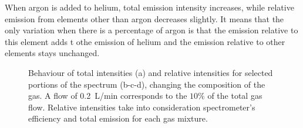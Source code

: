 When argon is added to helium, total emission intensity increases, while relative emission from elements other than argon decreases slightly. It means that the only variation when there is a percentage of argon is that the emission relative to this element adds t othe emission of helium and the emission relative to other elements stays unchanged.
\begin{figure}
\centering
  
  
  \hfill
  
\caption{Behaviour of total intensities (a) and relative intensities for selected portions of the spectrum (b-c-d), changing the composition of the gas. A flow of \SI{0.2}{\liter/\minute} corresponds to the $\num{10}\%$ of the total gas flow. Relative intensities take into consideration spectrometer's efficiency and total emission for each gas mixture.}
 \label{fig:Irel_flow}
\end{figure}
